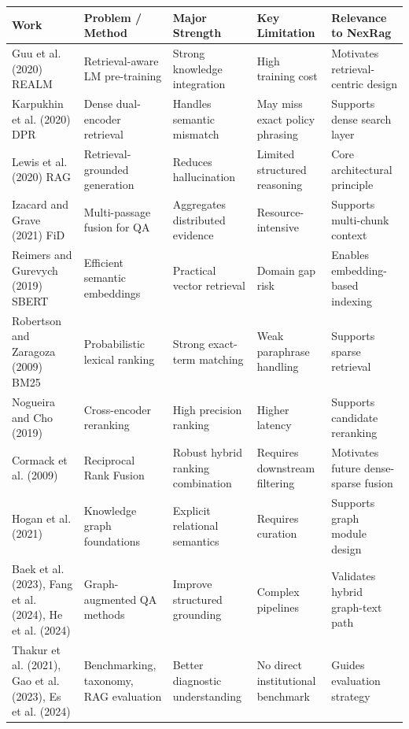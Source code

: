 \begingroup
\footnotesize
\renewcommand{\arraystretch}{1.12}
\setlength{\tabcolsep}{4pt}
\begin{longtable}{|>{\RaggedRight\arraybackslash\hspace{0pt}}p{}|>{\RaggedRight\arraybackslash\hspace{0pt}}p{}|>{\RaggedRight\arraybackslash\hspace{0pt}}p{}|>{\RaggedRight\arraybackslash\hspace{0pt}}p{}|>{\RaggedRight\arraybackslash\hspace{0pt}}p{}|}
\hline
\textbf{Work} & \textbf{Problem / Method} & \textbf{Major Strength} & \textbf{Key Limitation} & \textbf{Relevance to NexRag} \\ \hline
Guu et al. (2020) REALM & Retrieval-aware LM pre-training & Strong knowledge integration & High training cost & Motivates retrieval-centric design \\ \hline
Karpukhin et al. (2020) DPR & Dense dual-encoder retrieval & Handles semantic mismatch & May miss exact policy phrasing & Supports dense search layer \\ \hline
Lewis et al. (2020) RAG & Retrieval-grounded generation & Reduces hallucination & Limited structured reasoning & Core architectural principle \\ \hline
Izacard and Grave (2021) FiD & Multi-passage fusion for QA & Aggregates distributed evidence & Resource-intensive & Supports multi-chunk context \\ \hline
Reimers and Gurevych (2019) SBERT & Efficient semantic embeddings & Practical vector retrieval & Domain gap risk & Enables embedding-based indexing \\ \hline
Robertson and Zaragoza (2009) BM25 & Probabilistic lexical ranking & Strong exact-term matching & Weak paraphrase handling & Supports sparse retrieval \\ \hline
Nogueira and Cho (2019) & Cross-encoder reranking & High precision ranking & Higher latency & Supports candidate reranking \\ \hline
Cormack et al. (2009) & Reciprocal Rank Fusion & Robust hybrid ranking combination & Requires downstream filtering & Motivates future dense-sparse fusion \\ \hline
Hogan et al. (2021) & Knowledge graph foundations & Explicit relational semantics & Requires curation & Supports graph module design \\ \hline
Baek et al. (2023), Fang et al. (2024), He et al. (2024) & Graph-augmented QA methods & Improve structured grounding & Complex pipelines & Validates hybrid graph-text path \\ \hline
Thakur et al. (2021), Gao et al. (2023), Es et al. (2024) & Benchmarking, taxonomy, RAG evaluation & Better diagnostic understanding & No direct institutional benchmark & Guides evaluation strategy \\ \hline
\end{longtable}
\endgroup

